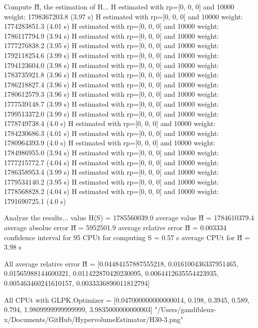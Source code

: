 Compute H̃, the estimation of H...
  H estimated with rp=[0, 0, 0] and 10000 weight:  1798367203.8  (3.97 s)
  H estimated with rp=[0, 0, 0] and 10000 weight:  1774283851.3  (4.01 s)
  H estimated with rp=[0, 0, 0] and 10000 weight:  1786117794.9  (3.94 s)
  H estimated with rp=[0, 0, 0] and 10000 weight:  1777276838.2  (3.95 s)
  H estimated with rp=[0, 0, 0] and 10000 weight:  1792118254.6  (3.99 s)
  H estimated with rp=[0, 0, 0] and 10000 weight:  1794123604.0  (3.98 s)
  H estimated with rp=[0, 0, 0] and 10000 weight:  1783735921.8  (3.96 s)
  H estimated with rp=[0, 0, 0] and 10000 weight:  1786218827.4  (3.96 s)
  H estimated with rp=[0, 0, 0] and 10000 weight:  1780612579.3  (3.96 s)
  H estimated with rp=[0, 0, 0] and 10000 weight:  1777539148.7  (3.99 s)
  H estimated with rp=[0, 0, 0] and 10000 weight:  1799513372.0  (3.99 s)
  H estimated with rp=[0, 0, 0] and 10000 weight:  1778749738.4  (4.0 s)
  H estimated with rp=[0, 0, 0] and 10000 weight:  1784230686.3  (4.01 s)
  H estimated with rp=[0, 0, 0] and 10000 weight:  1780964393.9  (4.0 s)
  H estimated with rp=[0, 0, 0] and 10000 weight:  1784986955.0  (3.94 s)
  H estimated with rp=[0, 0, 0] and 10000 weight:  1777215772.7  (4.04 s)
  H estimated with rp=[0, 0, 0] and 10000 weight:  1786358953.4  (3.99 s)
  H estimated with rp=[0, 0, 0] and 10000 weight:  1779534140.2  (3.95 s)
  H estimated with rp=[0, 0, 0] and 10000 weight:  1778568828.2  (4.04 s)
  H estimated with rp=[0, 0, 0] and 10000 weight:  1791690725.1  (4.0 s)

Analyze the results...
  value H(S)                  = 1785560039.0 
  average value H̃             = 1784610379.4 
  average absolue error H̃     = 5952501.9 
  average relative error H̃    = 0.003334 
  confidence interval for 95%
  CPUt for computing S         = 0.57 s
  average CPUt for H̃           = 3.98 s

All average relative error H̃ = [0.04484157887555218, 0.016100436337951465, 0.01565988144600321, 0.011422870420230095, 0.0064412635554423935, 0.005463460241610157, 0.0033336890011812794]

All CPUt with GLPK.Optimizer = [0.047000000000000014, 0.198, 0.3945, 0.589, 0.794, 1.9809999999999999, 3.9835000000000003]
"/Users/gandibleux-x/Documents/GitHub/HypervolumeEstimator/H30-3.png"